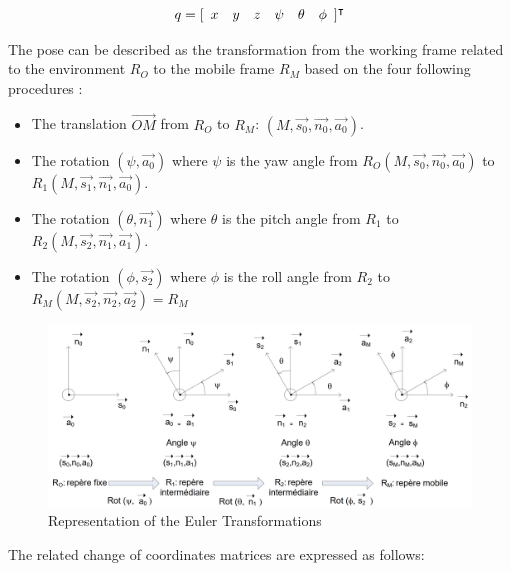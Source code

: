 \documentclass{thesisreport}
\begin{document}
\begin{equation}
q=[\begin{array}{c c c c c c }
x & y & z & \psi & \theta & \phi
\end{array}]^{\intercal}
\end{equation}

The pose can be described as the transformation from the working frame related to the environment $R_O$ to the mobile frame $R_M$ based on the four following procedures \cite{Fantoni2016}:

\begin{itemize}
	\item The translation $\overrightarrow{OM}$ from $R_O$ to $R_M$: $(M,\overrightarrow{s_0}, \overrightarrow{n_0}, \overrightarrow{a_0} )$.
	\item The rotation $(\psi, \overrightarrow{a_0})$ where $\psi$ is the yaw angle from $R_O(M,\overrightarrow{s_0}, \overrightarrow{n_0}, \overrightarrow{a_0} )$ to $R_1(M,\overrightarrow{s_1}, \overrightarrow{n_1}, \overrightarrow{a_0} )$.
	\item The rotation $(\theta, \overrightarrow{n_1})$ where $\theta$ is the pitch angle from $R_1$ to $R_2 (M,\overrightarrow{s_2}, \overrightarrow{n_1}, \overrightarrow{a_1} )$.
	\item The rotation $(\phi, \overrightarrow{s_2})$ where $\phi$ is the roll angle from $R_2$ to $R_M (M,\overrightarrow{s_2}, \overrightarrow{n_2}, \overrightarrow{a_2} ) = R_M$ 
\end{itemize}



\newpage

\begin{figure}[h]
\centering
\includegraphics[width=\textwidth]{Images/Modeling/Fantoni_d}
\caption{Representation of the Euler Transformations \cite{Fantoni2016} }
\label{Fantoni_d}
\end{figure}

The related change of coordinates matrices are expressed as follows:
\end{document}
